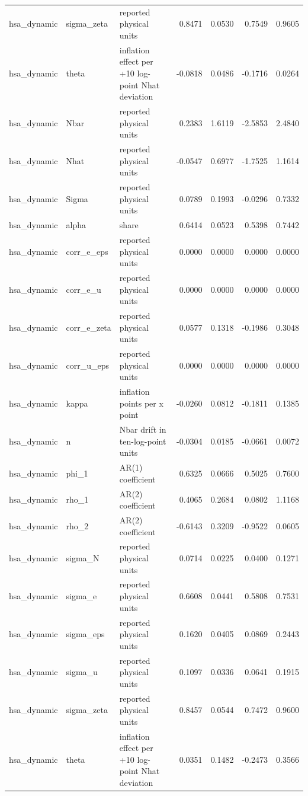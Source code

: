 \begin{tabular}{lllrrrr}
hsa\_dynamic & sigma\_zeta & reported physical units & 0.8471 & 0.0530 & 0.7549 & 0.9605 \\
hsa\_dynamic & theta & inflation effect per +10 log-point Nhat deviation & -0.0818 & 0.0486 & -0.1716 & 0.0264 \\
hsa\_dynamic & Nbar & reported physical units & 0.2383 & 1.6119 & -2.5853 & 2.4840 \\
hsa\_dynamic & Nhat & reported physical units & -0.0547 & 0.6977 & -1.7525 & 1.1614 \\
hsa\_dynamic & Sigma & reported physical units & 0.0789 & 0.1993 & -0.0296 & 0.7332 \\
hsa\_dynamic & alpha & share & 0.6414 & 0.0523 & 0.5398 & 0.7442 \\
hsa\_dynamic & corr\_e\_eps & reported physical units & 0.0000 & 0.0000 & 0.0000 & 0.0000 \\
hsa\_dynamic & corr\_e\_u & reported physical units & 0.0000 & 0.0000 & 0.0000 & 0.0000 \\
hsa\_dynamic & corr\_e\_zeta & reported physical units & 0.0577 & 0.1318 & -0.1986 & 0.3048 \\
hsa\_dynamic & corr\_u\_eps & reported physical units & 0.0000 & 0.0000 & 0.0000 & 0.0000 \\
hsa\_dynamic & kappa & inflation points per x point & -0.0260 & 0.0812 & -0.1811 & 0.1385 \\
hsa\_dynamic & n & Nbar drift in ten-log-point units & -0.0304 & 0.0185 & -0.0661 & 0.0072 \\
hsa\_dynamic & phi\_1 & AR(1) coefficient & 0.6325 & 0.0666 & 0.5025 & 0.7600 \\
hsa\_dynamic & rho\_1 & AR(2) coefficient & 0.4065 & 0.2684 & 0.0802 & 1.1168 \\
hsa\_dynamic & rho\_2 & AR(2) coefficient & -0.6143 & 0.3209 & -0.9522 & 0.0605 \\
hsa\_dynamic & sigma\_N & reported physical units & 0.0714 & 0.0225 & 0.0400 & 0.1271 \\
hsa\_dynamic & sigma\_e & reported physical units & 0.6608 & 0.0441 & 0.5808 & 0.7531 \\
hsa\_dynamic & sigma\_eps & reported physical units & 0.1620 & 0.0405 & 0.0869 & 0.2443 \\
hsa\_dynamic & sigma\_u & reported physical units & 0.1097 & 0.0336 & 0.0641 & 0.1915 \\
hsa\_dynamic & sigma\_zeta & reported physical units & 0.8457 & 0.0544 & 0.7472 & 0.9600 \\
hsa\_dynamic & theta & inflation effect per +10 log-point Nhat deviation & 0.0351 & 0.1482 & -0.2473 & 0.3566 \\

\end{tabular}
